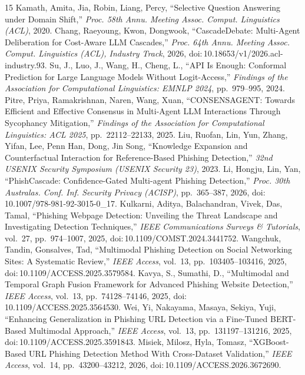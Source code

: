 \begin{thebibliography}{15}
 Kamath, Amita, Jia, Robin, Liang, Percy, ``Selective Question Answering under Domain Shift,'' \emph{Proc. 58th Annu. Meeting Assoc. Comput. Linguistics (ACL)}, 2020.
 Chang, Raeyoung, Kwon, Dongwook, ``CascadeDebate: Multi-Agent Deliberation for Cost-Aware LLM Cascades,'' \emph{Proc. 64th Annu. Meeting Assoc. Comput. Linguistics (ACL), Industry Track}, 2026, doi:\,10.18653/v1/2026.acl-industry.93.
 Su, J., Luo, J., Wang, H., Cheng, L., ``API Is Enough: Conformal Prediction for Large Language Models Without Logit-Access,'' \emph{Findings of the Association for Computational Linguistics: EMNLP 2024}, pp.\ 979--995, 2024.
 Pitre, Priya, Ramakrishnan, Naren, Wang, Xuan, ``CONSENSAGENT: Towards Efficient and Effective Consensus in Multi-Agent LLM Interactions Through Sycophancy Mitigation,'' \emph{Findings of the Association for Computational Linguistics: ACL 2025}, pp.\ 22112--22133, 2025.
 Liu, Ruofan, Lin, Yun, Zhang, Yifan, Lee, Penn Han, Dong, Jin Song, ``Knowledge Expansion and Counterfactual Interaction for Reference-Based Phishing Detection,'' \emph{32nd USENIX Security Symposium (USENIX Security 23)}, 2023.
 Li, Hongju, Lin, Yan, ``PhishCascade: Confidence-Gated Multi-agent Phishing Detection,'' \emph{Proc. 30th Australas. Conf. Inf. Security Privacy (ACISP)}, pp.\ 365--387, 2026, doi:\,10.1007/978-981-92-3015-0\_17.
 Kulkarni, Aditya, Balachandran, Vivek, Das, Tamal, ``Phishing Webpage Detection: Unveiling the Threat Landscape and Investigating Detection Techniques,'' \emph{IEEE Communications Surveys \& Tutorials}, vol.\ 27, pp.\ 974--1007, 2025, doi:\,10.1109/COMST.2024.3441752.
 Wangchuk, Tandin, Gonsalves, Tad, ``Multimodal Phishing Detection on Social Networking Sites: A Systematic Review,'' \emph{IEEE Access}, vol.\ 13, pp.\ 103405--103416, 2025, doi:\,10.1109/ACCESS.2025.3579584.
 Kavya, S., Sumathi, D., ``Multimodal and Temporal Graph Fusion Framework for Advanced Phishing Website Detection,'' \emph{IEEE Access}, vol.\ 13, pp.\ 74128--74146, 2025, doi:\,10.1109/ACCESS.2025.3564530.
 Wei, Yi, Nakayama, Masaya, Sekiya, Yuji, ``Enhancing Generalization in Phishing URL Detection via a Fine-Tuned BERT-Based Multimodal Approach,'' \emph{IEEE Access}, vol.\ 13, pp.\ 131197--131216, 2025, doi:\,10.1109/ACCESS.2025.3591843.
 Misiek, Milosz, Hyla, Tomasz, ``XGBoost-Based URL Phishing Detection Method With Cross-Dataset Validation,'' \emph{IEEE Access}, vol.\ 14, pp.\ 43200--43212, 2026, doi:\,10.1109/ACCESS.2026.3672690.

\end{thebibliography}
